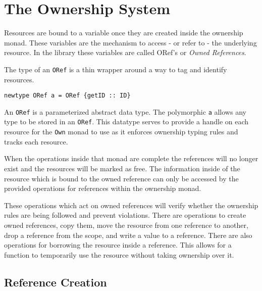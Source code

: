 \documentclass[onehalf,11pt]{beavtex}
\begin{document}
\section{The Ownership System}

Resources are bound to a variable once they are created inside the ownership
monad.  These variables are the mechanism to access - or refer to - the
underlying resource.  In the library these variables are called ORef's
or \textit{Owned References}.

The type of an \texttt{ORef} is a thin wrapper around a way to tag and identify
resources.

\begin{verbatim}
newtype ORef a = ORef {getID :: ID}
\end{verbatim}

An \texttt{ORef} is a parameterized abstract data type.
The polymorphic \texttt{a} allows any type to be stored in an \texttt{ORef}.
This datatype serves to provide a handle on each resource for the \texttt{Own}
monad to use as it enforces ownership typing rules and tracks each resource.


When the operations inside that monad are complete the references
will no longer exist and the resources will be marked as free.
The information inside of the resource which is bound to the owned reference can
only be accessed by the provided operations for references within the ownership
monad.

These operations which act on owned references will verify whether the ownership
rules are being followed and prevent violations.  There are operations to create
owned references, copy them, move the resource from one reference to another,
drop a reference from the scope, and write a value to a reference.  There are
also operations for borrowing the resource inside a reference. This allows for a
function to temporarily use the resource without taking ownership over it.


\subsection{Reference Creation}
\end{document}

